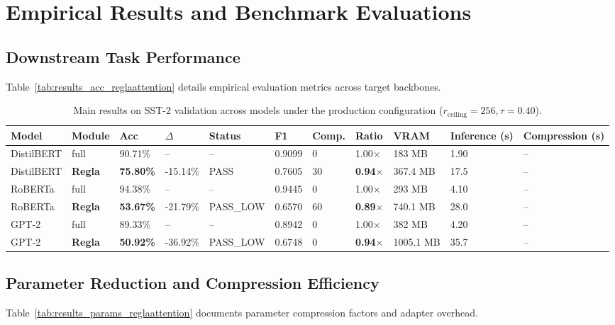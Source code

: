 \section{Empirical Results and Benchmark Evaluations}

\subsection{Downstream Task Performance}
Table~\ref{tab:results_acc_reglaattention} details empirical evaluation metrics across target backbones.

\begin{table}[t]
\centering
\small
\begin{tabular}{lllllllllll}
\toprule
\textbf{Model} & \textbf{Module} & \textbf{Acc} & \textbf{$\Delta$} & \textbf{Status} & \textbf{F1} & \textbf{Comp.} & \textbf{Ratio} & \textbf{VRAM} & \textbf{Inference (s)} & \textbf{Compression (s)} \\
\midrule
DistilBERT & full & 90.71\% & -- & -- & 0.9099 & 0 & 1.00$\times$ & 183 MB & 1.90 & -- \\
DistilBERT & \textbf{Regla} & \textbf{75.80\%} & -15.14\% & PASS & 0.7605 & 30 & \textbf{0.94$\times$} & 367.4 MB & 17.5 & -- \\
RoBERTa & full & 94.38\% & -- & -- & 0.9445 & 0 & 1.00$\times$ & 293 MB & 4.10 & -- \\
RoBERTa & \textbf{Regla} & \textbf{53.67\%} & -21.79\% & PASS\_LOW & 0.6570 & 60 & \textbf{0.89$\times$} & 740.1 MB & 28.0 & -- \\
GPT-2 & full & 89.33\% & -- & -- & 0.8942 & 0 & 1.00$\times$ & 382 MB & 4.20 & -- \\
GPT-2 & \textbf{Regla} & \textbf{50.92\%} & -36.92\% & PASS\_LOW & 0.6748 & 0 & \textbf{0.94$\times$} & 1005.1 MB & 35.7 & -- \\
\bottomrule
\end{tabular}
\caption{Main results on SST-2 validation across models under the production configuration ($r_{\mathrm{ceiling}}=256, \tau=0.40$).}
\label{tab:main_sst2}
\end{table}

\subsection{Parameter Reduction and Compression Efficiency}
Table~\ref{tab:results_params_reglaattention} documents parameter compression factors and adapter overhead.

